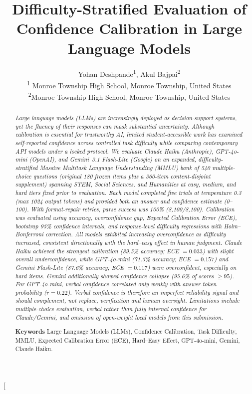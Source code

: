 \documentclass[twoside,twocolumn,10pt]{article}
\title{\fontsize{16}{20}\selectfont\textbf{Difficulty-Stratified Evaluation of Confidence Calibration in Large Language Models}}
\author{
    \fontsize{12}{14}\selectfont
    Yohan Deshpande\textsuperscript{1}, Akul Bajpai\textsuperscript{2}\\[1ex]
    \fontsize{12}{14}\selectfont
    \textsuperscript{1} Monroe Township High School, Monroe Township, United States \\
   \textsuperscript{2}Monroe Township High School, Monroe Township, United States
}
\date{}
\begin{document}
\twocolumn[
\begin{@twocolumnfalse}
\vspace{-0.5cm}
\raggedright

{\fontsize{11}{13}\selectfont{Research Article}}
\vspace{-0.8cm}

\maketitle

\thispagestyle{firstpage}
\begin{abstract}
\fontsize{11}{13}\selectfont
\vspace{1em}
\justifying
\textit{Large language models (LLMs) are increasingly deployed as decision-support systems, yet the fluency of their responses can mask substantial uncertainty. Although calibration is essential for trustworthy AI, limited student-accessible work has examined self-reported confidence across controlled task difficulty while comparing contemporary API models under a locked protocol. We evaluate Claude Haiku (Anthropic), GPT-4o-mini (OpenAI), and Gemini~3.1 Flash-Lite (Google) on an expanded, difficulty-stratified Massive Multitask Language Understanding (MMLU) bank of 540 multiple-choice questions (original 180 frozen items plus a 360-item content-disjoint supplement) spanning STEM, Social Sciences, and Humanities at easy, medium, and hard tiers fixed prior to evaluation. Each model completed five trials at temperature 0.3 (max 1024 output tokens) and provided both an answer and confidence estimate (0--100). With format-repair retries, parse success was 100\% (8{,}100/8{,}100). Calibration was evaluated using accuracy, overconfidence gap, Expected Calibration Error (ECE), bootstrap 95\% confidence intervals, and response-level difficulty regressions with Holm--Bonferroni correction. All models exhibited increasing overconfidence as difficulty increased, consistent directionally with the hard--easy effect in human judgment. Claude Haiku achieved the strongest calibration (89.5\% accuracy; ECE $= 0.033$) with slight overall underconfidence, while GPT-4o-mini (71.5\% accuracy; ECE $= 0.157$) and Gemini Flash-Lite (87.6\% accuracy; ECE $= 0.117$) were overconfident, especially on hard items. Gemini additionally showed confidence collapse (95.6\% of scores $\geq 95$). For GPT-4o-mini, verbal confidence correlated only weakly with answer-token probability ($r = 0.22$). Verbal confidence is therefore an imperfect reliability signal and should complement, not replace, verification and human oversight. Limitations include multiple-choice evaluation, verbal rather than fully internal confidence for Claude/Gemini, and omission of open-weight local models from this submission.}

\vspace{-0.1cm}
\noindent\textbf{Keywords}
 Large Language Models (LLMs), Confidence Calibration, Task Difficulty, MMLU, Expected Calibration Error (ECE), Hard--Easy Effect, GPT-4o-mini, Gemini, Claude Haiku.

\end{abstract}

\vspace{1cm}
\end{@twocolumnfalse}
\end{document}
